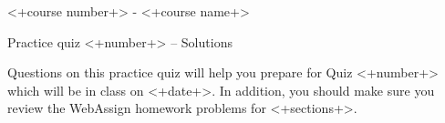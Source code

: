 
\medskip
\begin{center}
  <+course number+> - <+course name+>

  \Large Practice quiz <+number+>
  \ifprintanswers
    -- Solutions
  \els
  \fi
\end{center}
\hrulefill
\bigskip

Questions on this practice quiz will help you prepare for Quiz <+number+> which will be in class on <+date+>.
In addition, you should make sure you review the WebAssign homework problems for <+sections+>.


